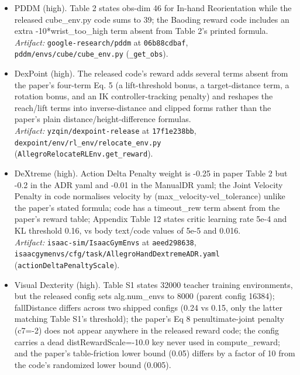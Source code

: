 \begin{itemize}
\item PDDM \cite{pddm_2019} (high). Table 2 states obs-dim 46 for In-hand Reorientation while the released cube\_\allowbreak{}env.py code sums to 39; the Baoding reward code includes an extra -10*wrist\_\allowbreak{}too\_\allowbreak{}high term absent from Table 2's printed formula.
  \\ \emph{Artifact:} \texttt{google-research/\allowbreak{}pddm} at \texttt{06b88cdbaf}, \texttt{pddm/\allowbreak{}envs/\allowbreak{}cube/\allowbreak{}cube\_\allowbreak{}env.py} (\texttt{\_\allowbreak{}get\_\allowbreak{}obs}).
\item DexPoint \cite{dexpoint_2022} (high). The released code's reward adds several terms absent from the paper's four-term Eq. 5 (a lift-threshold bonus, a target-distance term, a rotation bonus, and an IK controller-tracking penalty) and reshapes the reach/lift terms into inverse-distance and clipped forms rather than the paper's plain distance/height-difference formulas.
  \\ \emph{Artifact:} \texttt{yzqin/\allowbreak{}dexpoint-release} at \texttt{17f1e238bb}, \texttt{dexpoint/\allowbreak{}env/\allowbreak{}rl\_\allowbreak{}env/\allowbreak{}relocate\_\allowbreak{}env.py} (\texttt{AllegroRelocateRLEnv.get\_\allowbreak{}reward}).
\item DeXtreme \cite{dextreme_2022} (high). Action Delta Penalty weight is -0.25 in paper Table 2 but -0.2 in the ADR yaml and -0.01 in the ManualDR yaml; the Joint Velocity Penalty in code normalises velocity by (max\_\allowbreak{}velocity-vel\_\allowbreak{}tolerance) unlike the paper's stated formula; code has a timeout\_\allowbreak{}rew term absent from the paper's reward table; Appendix Table 12 states critic learning rate 5e-4 and KL threshold 0.16, vs body text/code values of 5e-5 and 0.016.
  \\ \emph{Artifact:} \texttt{isaac-sim/\allowbreak{}IsaacGymEnvs} at \texttt{aeed298638}, \texttt{isaacgymenvs/\allowbreak{}cfg/\allowbreak{}task/\allowbreak{}AllegroHandDextremeADR.yaml} (\texttt{actionDeltaPenaltyScale}).
\item Visual Dexterity \cite{visual_dexterity_2022} (high). Table S1 states 32000 teacher training environments, but the released config sets alg.num\_\allowbreak{}envs to 8000 (parent config 16384); fallDistance differs across two shipped configs (0.24 vs 0.15, only the latter matching Table S1's threshold); the paper's Eq 8 penultimate-joint penalty (c7=-2) does not appear anywhere in the released reward code; the config carries a dead distRewardScale=-10.0 key never used in compute\_\allowbreak{}reward; and the paper's table-friction lower bound (0.05) differs by a factor of 10 from the code's randomized lower bound (0.005).

\end{itemize}
